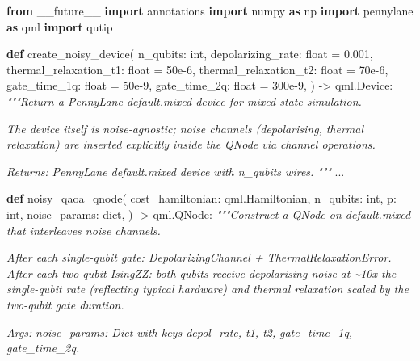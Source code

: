 \documentclass[
  11pt,
]{report}
\newenvironment{Shaded}{}{}
\newcommand{\BuiltInTok}[1]{\textcolor[rgb]{0.00,0.50,0.00}{#1}}
\newcommand{\CommentTok}[1]{\textcolor[rgb]{0.38,0.63,0.69}{\textit{#1}}}
\newcommand{\FloatTok}[1]{\textcolor[rgb]{0.25,0.63,0.44}{#1}}
\newcommand{\ImportTok}[1]{\textcolor[rgb]{0.00,0.50,0.00}{\textbf{#1}}}
\newcommand{\KeywordTok}[1]{\textcolor[rgb]{0.00,0.44,0.13}{\textbf{#1}}}
\newcommand{\NormalTok}[1]{#1}
\newcommand{\OperatorTok}[1]{\textcolor[rgb]{0.40,0.40,0.40}{#1}}
\begin{document}
\begin{Shaded}
\begin{Highlighting}[]
\ImportTok{from}\NormalTok{ \_\_future\_\_ }\ImportTok{import}\NormalTok{ annotations}
\ImportTok{import}\NormalTok{ numpy }\ImportTok{as}\NormalTok{ np}
\ImportTok{import}\NormalTok{ pennylane }\ImportTok{as}\NormalTok{ qml}
\ImportTok{import}\NormalTok{ qutip}


\KeywordTok{def}\NormalTok{ create\_noisy\_device(}
\NormalTok{    n\_qubits: }\BuiltInTok{int}\NormalTok{,}
\NormalTok{    depolarizing\_rate: }\BuiltInTok{float} \OperatorTok{=} \FloatTok{0.001}\NormalTok{,}
\NormalTok{    thermal\_relaxation\_t1: }\BuiltInTok{float} \OperatorTok{=} \FloatTok{50e{-}6}\NormalTok{,}
\NormalTok{    thermal\_relaxation\_t2: }\BuiltInTok{float} \OperatorTok{=} \FloatTok{70e{-}6}\NormalTok{,}
\NormalTok{    gate\_time\_1q: }\BuiltInTok{float} \OperatorTok{=} \FloatTok{50e{-}9}\NormalTok{,}
\NormalTok{    gate\_time\_2q: }\BuiltInTok{float} \OperatorTok{=} \FloatTok{300e{-}9}\NormalTok{,}
\NormalTok{) }\OperatorTok{{-}\textgreater{}}\NormalTok{ qml.Device:}
    \CommentTok{"""Return a PennyLane default.mixed device for mixed{-}state simulation.}

\CommentTok{    The device itself is noise{-}agnostic; noise channels (depolarising,}
\CommentTok{    thermal relaxation) are inserted explicitly inside the QNode via}
\CommentTok{    channel operations.}

\CommentTok{    Returns:}
\CommentTok{        PennyLane default.mixed device with n\_qubits wires.}
\CommentTok{    """}
\NormalTok{    ...}


\KeywordTok{def}\NormalTok{ noisy\_qaoa\_qnode(}
\NormalTok{    cost\_hamiltonian: qml.Hamiltonian,}
\NormalTok{    n\_qubits: }\BuiltInTok{int}\NormalTok{,}
\NormalTok{    p: }\BuiltInTok{int}\NormalTok{,}
\NormalTok{    noise\_params: }\BuiltInTok{dict}\NormalTok{,}
\NormalTok{) }\OperatorTok{{-}\textgreater{}}\NormalTok{ qml.QNode:}
    \CommentTok{"""Construct a QNode on default.mixed that interleaves noise channels.}

\CommentTok{    After each single{-}qubit gate: DepolarizingChannel + ThermalRelaxationError.}
\CommentTok{    After each two{-}qubit IsingZZ: both qubits receive depolarising noise}
\CommentTok{    at \textasciitilde{}10x the single{-}qubit rate (reflecting typical hardware) and}
\CommentTok{    thermal relaxation scaled by the two{-}qubit gate duration.}

\CommentTok{    Args:}
\CommentTok{        noise\_params: Dict with keys \textquotesingle{}depol\_rate\textquotesingle{}, \textquotesingle{}t1\textquotesingle{}, \textquotesingle{}t2\textquotesingle{},}
\CommentTok{                      \textquotesingle{}gate\_time\_1q\textquotesingle{}, \textquotesingle{}gate\_time\_2q\textquotesingle{}.}


\end{Highlighting}
\end{Shaded}
\end{document}
